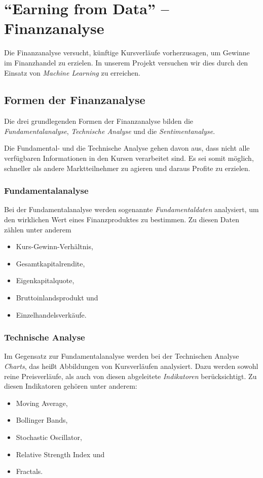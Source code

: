 \section{\enquote{Earning from Data} -- Finanzanalyse}
\author{Dennis Kempf, Moritz Hollenberg, Patrice Becker}

Die Finanzanalyse versucht, künftige Kursverläufe vorherzusagen, um Gewinne im Finanzhandel zu erzielen. In unserem Projekt versuchen wir dies durch den Einsatz von \emph{Machine Learning} zu erreichen.

\subsection{Formen der Finanzanalyse}
\author{Dennis Kempf}

Die drei grundlegenden Formen der Finanzanalyse bilden die \emph{Fundamentalanalyse}, \emph{Technische Analyse} und die \emph{Sentimentanalyse}. 

Die Fundamental- und die Technische Analyse gehen davon aus, dass nicht alle verfügbaren Informationen in den Kursen verarbeitet sind. Es sei somit möglich, schneller als andere Marktteilnehmer zu agieren und daraus Profite zu erzielen.

\subsubsection{Fundamentalanalyse}
\author{Dennis Kempf}

Bei der Fundamentalanalyse werden sogenannte \emph{Fundamentaldaten} analysiert, um den wirklichen Wert eines Finanzproduktes zu bestimmen. Zu diesen Daten zählen unter anderem
\begin{itemize}
	\item Kurs-Gewinn-Verhältnis,
	\item Gesamtkapitalrendite,
	\item Eigenkapitalquote,
	\item Bruttoinlandsprodukt und
	\item Einzelhandelsverkäufe.
\end{itemize}

\subsubsection{Technische Analyse}
\author{Dennis Kempf}
\label{sssec:TechnischeAnalyse}

Im Gegensatz zur Fundamentalanalyse werden bei der Technischen Analyse \emph{Charts}, das heißt Abbildungen von Kursverläufen analysiert. Dazu werden sowohl reine Preisverläufe, als auch von diesen abgeleitete \emph{Indikatoren} berücksichtigt. Zu diesen Indikatoren gehören unter anderem:
\begin{itemize}
	\item Moving Average,
	\item Bollinger Bands,
	\item Stochastic Oscillator,
	\item Relative Strength Index und
	\item Fractals.
\end{itemize}

